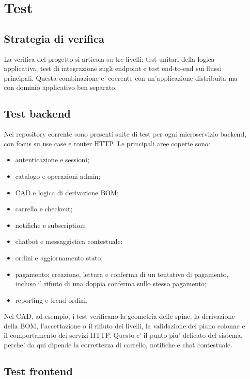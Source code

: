 \chapter{Test}

\section{Strategia di verifica}

La verifica del progetto si articola su tre livelli: test unitari della logica applicativa, test di integrazione sugli endpoint e test end-to-end sui flussi principali. Questa combinazione e' coerente con un'applicazione distribuita ma con dominio applicativo ben separato.

\section{Test backend}

Nel repository corrente sono presenti suite di test per ogni microservizio backend, con focus su use case e router HTTP. Le principali aree coperte sono:

\begin{itemize}
\item autenticazione e sessioni;
\item catalogo e operazioni admin;
\item CAD e logica di derivazione BOM;
\item carrello e checkout;
\item notifiche e subscription;
\item chatbot e messaggistica contestuale;
\item ordini e aggiornamento stato;
\item pagamento: creazione, lettura e conferma di un tentativo di pagamento, incluso il rifiuto di una doppia conferma sullo stesso pagamento;
\item reporting e trend ordini.
\end{itemize}

Nel CAD, ad esempio, i test verificano la geometria delle spine, la derivazione della BOM, l'accettazione o il rifiuto dei livelli, la validazione del piano colonne e il comportamento dei servizi HTTP. Questo e' il punto piu' delicato del sistema, perche' da qui dipende la correttezza di carrello, notifiche e chat contestuale.

\section{Test frontend}

